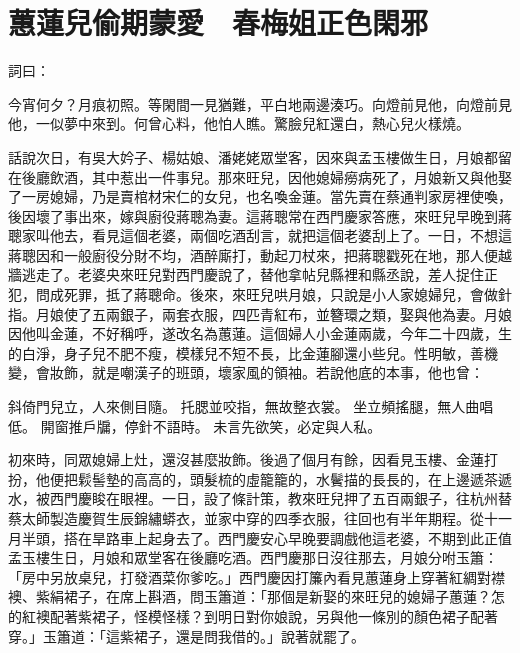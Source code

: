 %

\chapter{蕙蓮兒偷期蒙愛　春梅姐正色閑邪}

詞曰：

今宵何夕？月痕初照。等閑間一見猶難，平白地兩邊湊巧。向燈前見他，向燈前見他，一似夢中來到。何曾心料，他怕人瞧。驚臉兒紅還白，熱心兒火樣燒。

話說次日，有吳大妗子、楊姑娘、潘姥姥眾堂客，因來與孟玉樓做生日，月娘都留在後廳飲酒，其中惹出一件事兒。那來旺兒，因他媳婦癆病死了，月娘新又與他娶了一房媳婦，乃是賣棺材宋仁的女兒，也名喚金蓮。當先賣在蔡通判家房裡使喚，後因壞了事出來，嫁與廚役蔣聰為妻。這蔣聰常在西門慶家答應，來旺兒早晚到蔣聰家叫他去，看見這個老婆，兩個吃酒刮言，就把這個老婆刮上了。一日，不想這蔣聰因和一般廚役分財不均，酒醉廝打，動起刀杖來，把蔣聰戳死在地，那人便越牆逃走了。老婆央來旺兒對西門慶說了，替他拿帖兒縣裡和縣丞說，差人捉住正犯，問成死罪，抵了蔣聰命。後來，來旺兒哄月娘，只說是小人家媳婦兒，會做針指。月娘使了五兩銀子，兩套衣服，四匹青紅布，並簪環之類，娶與他為妻。月娘因他叫金蓮，不好稱呼，遂改名為蕙蓮。這個婦人小金蓮兩歲，今年二十四歲，生的白淨，身子兒不肥不瘦，模樣兒不短不長，比金蓮腳還小些兒。性明敏，善機變，會妝飾，就是嘲漢子的班頭，壞家風的領袖。若說他底的本事，他也曾：

斜倚門兒立，人來側目隨。
托腮並咬指，無故整衣裳。
坐立頻搖腿，無人曲唱低。
開窗推戶牖，停針不語時。
未言先欲笑，必定與人私。

初來時，同眾媳婦上灶，還沒甚麼妝飾。後過了個月有餘，因看見玉樓、金蓮打扮，他便把鬏髻墊的高高的，頭髮梳的虛籠籠的，水鬢描的長長的，在上邊遞茶遞水，被西門慶睃在眼裡。一日，設了條計策，教來旺兒押了五百兩銀子，往杭州替蔡太師製造慶賀生辰錦繡蟒衣，並家中穿的四季衣服，往回也有半年期程。從十一月半頭，搭在旱路車上起身去了。西門慶安心早晚要調戲他這老婆，不期到此正值孟玉樓生日，月娘和眾堂客在後廳吃酒。西門慶那日沒往那去，月娘分咐玉簫： 「房中另放桌兒，打發酒菜你爹吃。」西門慶因打簾內看見蕙蓮身上穿著紅綢對襟襖、紫絹裙子，在席上斟酒，問玉簫道：「那個是新娶的來旺兒的媳婦子蕙蓮？怎的紅襖配著紫裙子，怪模怪樣？到明日對你娘說，另與他一條別的顏色裙子配著穿。」玉簫道：「這紫裙子，還是問我借的。」說著就罷了。

